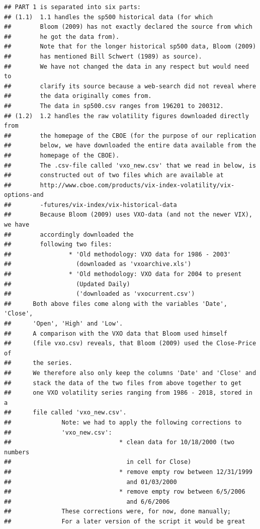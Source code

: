 \documentclass[a4paper,12pt,oneside,pointednumbers,bibtotoc,bigheadings,liststotoc]{scrbook}
\begin{document}
\begin{verbatim}
## PART 1 is separated into six parts:
## (1.1)  1.1 handles the sp500 historical data (for which 
##        Bloom (2009) has not exactly declared the source from which 
##        he got the data from).
##        Note that for the longer historical sp500 data, Bloom (2009) 
##        has mentioned Bill Schwert (1989) as source). 
##        We have not changed the data in any respect but would need to 
##        clarify its source because a web-search did not reveal where 
##        the data originally comes from.
##        The data in sp500.csv ranges from 196201 to 200312.
## (1.2)  1.2 handles the raw volatility figures downloaded directly from
##        the homepage of the CBOE (for the purpose of our replication 
##        below, we have downloaded the entire data available from the 
##        homepage of the CBOE).
##        The .csv-file called 'vxo_new.csv' that we read in below, is 
##        constructed out of two files which are available at 
##        http://www.cboe.com/products/vix-index-volatility/vix-options-and
##        -futures/vix-index/vix-historical-data
##        Because Bloom (2009) uses VXO-data (and not the newer VIX), we have 
##        accordingly downloaded the 
##        following two files:
##                * 'Old methodology: VXO data for 1986 - 2003' 
##                  (downloaded as 'vxoarchive.xls')
##                * 'Old methodology: VXO data for 2004 to present 
##                  (Updated Daily) 
##                  ('downloaded as 'vxocurrent.csv')
##      Both above files come along with the variables 'Date', 'Close', 
##      'Open', 'High' and 'Low'.
##      A comparison with the VXO data that Bloom used himself 
##      (file vxo.csv) reveals, that Bloom (2009) used the Close-Price of 
##      the series. 
##      We therefore also only keep the columns 'Date' and 'Close' and 
##      stack the data of the two files from above together to get
##      one VXO volatility series ranging from 1986 - 2018, stored in a 
##      file called 'vxo_new.csv'.
##              Note: we had to apply the following corrections to 
##              'vxo_new.csv':
##                              * clean data for 10/18/2000 (two numbers 
##                                in cell for Close)
##                              * remove empty row between 12/31/1999 
##                                and 01/03/2000
##                              * remove empty row between 6/5/2006 
##                                and 6/6/2006
##              These corrections were, for now, done manually;
##              For a later version of the script it would be great 

\end{verbatim}
\end{document}
